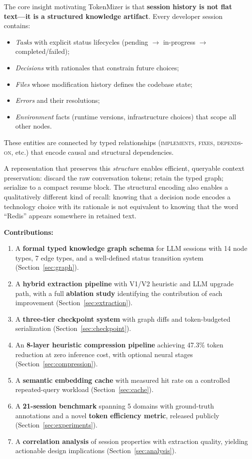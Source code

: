 \documentclass[journal]{IEEEtran}
\begin{document}
The core insight motivating TokenMizer is that
\textbf{session history is not flat text---it is a structured
knowledge artifact}. Every developer session contains:
\begin{itemize}
  \item \emph{Tasks} with explicit status lifecycles
    (pending $\to$ in-progress $\to$ completed/failed);
  \item \emph{Decisions} with rationales that constrain future
    choices;
  \item \emph{Files} whose modification history defines the
    codebase state;
  \item \emph{Errors} and their resolutions;
  \item \emph{Environment} facts (runtime versions,
    infrastructure choices) that scope all other nodes.
\end{itemize}
These entities are connected by typed relationships
(\textsc{implements}, \textsc{fixes}, \textsc{depends-on},
etc.) that encode causal and structural dependencies.

A representation that preserves this \emph{structure} enables
efficient, queryable context preservation: discard the raw
conversation tokens; retain the typed graph; serialize to a
compact resume block.
The structural encoding also enables a qualitatively different
kind of recall: knowing that a decision node encodes a
technology choice with its rationale is not equivalent to
knowing that the word ``Redis'' appears somewhere in retained
text.

\textbf{Contributions:}
\begin{enumerate}
\item A \textbf{formal typed knowledge graph schema} for LLM
  sessions with 14 node types, 7 edge types, and a
  well-defined status transition system
  (Section~\ref{sec:graph}).
\item A \textbf{hybrid extraction pipeline} with V1/V2
  heuristic and LLM upgrade path, with a full
  \textbf{ablation study} identifying the contribution of
  each improvement (Section~\ref{sec:extraction}).
\item A \textbf{three-tier checkpoint system} with graph diffs
  and token-budgeted serialization
  (Section~\ref{sec:checkpoint}).
\item An \textbf{8-layer heuristic compression pipeline}
  achieving 47.3\% token reduction at zero inference cost,
  with optional neural stages (Section~\ref{sec:compression}).
\item A \textbf{semantic embedding cache} with measured
  hit rate on a controlled repeated-query workload
  (Section~\ref{sec:cache}).
\item A \textbf{21-session benchmark} spanning 5 domains
  with ground-truth annotations and a novel
  \textbf{token efficiency metric}, released publicly
  (Section~\ref{sec:experiments}).
\item A \textbf{correlation analysis} of session properties
  with extraction quality, yielding actionable design
  implications (Section~\ref{sec:analysis}).
\end{enumerate}
\end{document}
